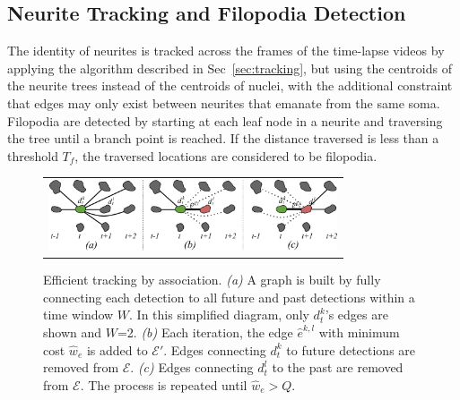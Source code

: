 \subsection{Neurite Tracking and Filopodia Detection}
\label{sec:neurite}
\vspace{-2mm}  The identity  of neurites  is tracked  across the  frames  of the
time-lapse videos by applying the algorithm described in Sec~\ref{sec:tracking},
but using the centroids of the  neurite trees instead of the centroids of nuclei, with
the  additional constraint  that  edges  may only  exist  between neurites  that
emanate from  the same soma.   Filopodia are detected  by starting at  each leaf
node in a  neurite and traversing the  tree until a branch point  is reached. If
the distance traversed  is less than a threshold  $T_f$, the traversed locations
are considered to be filopodia.


\begin{figure}[t]
  \centering
       \begin{tabular}{@{\hspace{-1mm}}c@{}}
        \includegraphics[width = 85mm] {images/greedytracking.pdf}\\ [-2.4ex]
       \end{tabular} 
    \caption{ \footnotesize Efficient tracking by association.  {\em  (a)} A graph is
	built by fully connecting each detection to all future and past detections within  a time  window  $W$.
	In this simplified diagram, only  $d^k_t$'s edges  are
	shown and $W$=2. {\em  (b)} Each iteration,  the edge $\hat{e}^{k,l}$
        with   minimum  cost   $\hat{w}_e$  is  added  to $\mathcal{E}'$.   Edges  connecting
        $d^k_t$ to  future detections are  removed from $\mathcal{E}$.
        {\em  (c)} Edges  connecting  $d^l_t$ to  the past  are
        removed from $\mathcal{E}$.  The process is repeated until $\hat w_e > Q$. }
    \label{fig:greedytracking}
\end{figure}


